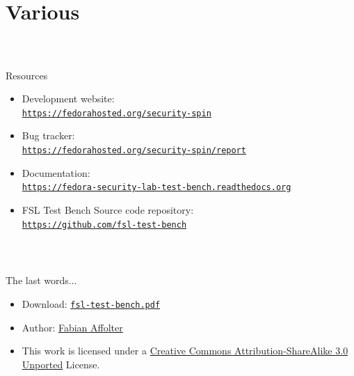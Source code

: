 \section{Various}
%
\begin{frame}
\frametitle{\\}
%
{\LARGE Resources \newline}
\begin{itemize}
  \item Development website: \\ {\scriptsize\texttt{\href{https://fedorahosted.org/security-spin}{https://fedorahosted.org/security-spin}}}
  \item Bug tracker: \\ {\scriptsize\texttt{\href{https://fedorahosted.org/security-spin/report}{https://fedorahosted.org/security-spin/report}}}
    \item Documentation: \\ {\scriptsize\texttt{\href{https://fedora-security-lab-test-bench.readthedocs.org}{https://fedora-security-lab-test-bench.readthedocs.org}}}
  \item FSL Test Bench Source code repository: \\ {\scriptsize \texttt{\href{https://github.com/fsl-test-bench}{https://github.com/fsl-test-bench}}}
\end{itemize}
\end{frame}
%
\begin{frame}
\frametitle{\\}
%
{\LARGE The last words... \newline}
\begin{itemize}
  \item Download: {\scriptsize\texttt{\href{https://git.fedorahosted.org/cgit/security-spin.git/tree/presentations/2013-fsl-test-bench/fsl-test-bench.pdf}{fsl-test-bench.pdf}}}
  \item Author: \href{mailto:fab@fedoraproject.org}{Fabian Affolter}
  \item This work is licensed under a \href{http://creativecommons.org/licenses/by-sa/3.0/deed.en_US}{Creative Commons Attribution-ShareAlike 3.0 Unported} License. 
\end{itemize}
\end{frame}
%
